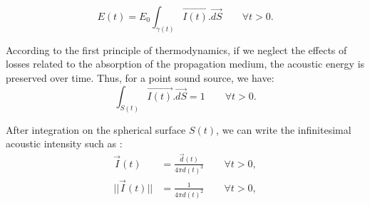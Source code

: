\documentclass[AMA,STIX1COL]{WileyNJD-v2}
\begin{document}
\begin{equation} 
E(t) = E_0 \int_{\gamma(t)} \overrightarrow{I(t)}.\overrightarrow{dS} \qquad \forall t > 0.
\end{equation}

According to the first principle of thermodynamics, if we neglect the effects of losses related to the absorption of the propagation medium, the acoustic energy is preserved over time. Thus, for a point sound source, we have:
\begin{equation} 
\int_{S(t)} \overrightarrow{I(t)}.\overrightarrow{dS} = 1 \qquad \forall t > 0.
\end{equation}

After integration on the spherical surface $S(t)$, we can write the infinitesimal acoustic intensity such as :
\begin{align} 
 \overrightarrow{I}(t) &= \frac{ \overrightarrow{d}(t)}{4\pi d(t)^3} \qquad \forall t > 0 \nonumber, \\
|| \overrightarrow{I}(t) || &= \frac{1}{4\pi d(t)^2} \qquad \forall t > 0,
\end{align}
\end{document}
